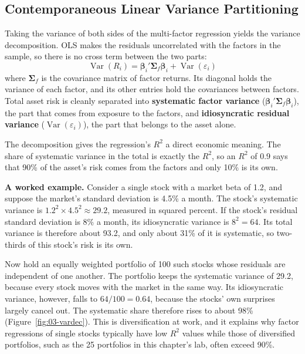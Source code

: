 \subsection{Contemporaneous Linear Variance Partitioning}
Taking the variance of both sides of the multi-factor regression yields the variance decomposition. OLS makes the residuals uncorrelated with the factors in the sample, so there is no cross term between the two parts:
\begin{equation}
  \operatorname{Var}(R_i) = \boldsymbol{\beta}_i' \boldsymbol{\Sigma}_f \boldsymbol{\beta}_i + \operatorname{Var}(\varepsilon_i)
  \label{eq:03-vardec}
\end{equation}
where $\boldsymbol{\Sigma}_f$ is the covariance matrix of factor returns. Its diagonal holds the variance of each factor, and its other entries hold the covariances between factors. Total asset risk is cleanly separated into \textbf{systematic factor variance} ($\boldsymbol{\beta}_i' \boldsymbol{\Sigma}_f \boldsymbol{\beta}_i$), the part that comes from exposure to the factors, and \textbf{idiosyncratic residual variance} ($\operatorname{Var}(\varepsilon_i)$), the part that belongs to the asset alone.

The decomposition gives the regression's $R^2$ a direct economic meaning. The share of systematic variance in the total is exactly the $R^2$, so an $R^2$ of 0.9 says that 90\% of the asset's risk comes from the factors and only 10\% is its own.

\textbf{A worked example.} Consider a single stock with a market beta of 1.2, and suppose the market's standard deviation is 4.5\% a month. The stock's systematic variance is $1.2^2 \times 4.5^2 \approx 29.2$, measured in squared percent. If the stock's residual standard deviation is 8\% a month, its idiosyncratic variance is $8^2 = 64$. Its total variance is therefore about 93.2, and only about 31\% of it is systematic, so two-thirds of this stock's risk is its own.

Now hold an equally weighted portfolio of 100 such stocks whose residuals are independent of one another. The portfolio keeps the systematic variance of 29.2, because every stock moves with the market in the same way. Its idiosyncratic variance, however, falls to $64/100 = 0.64$, because the stocks' own surprises largely cancel out. The systematic share therefore rises to about 98\% (Figure~\ref{fig:03-vardec}). This is diversification at work, and it explains why factor regressions of single stocks typically have low $R^2$ values while those of diversified portfolios, such as the 25 portfolios in this chapter's lab, often exceed 90\%.

